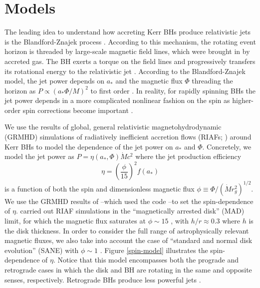 \documentclass[twocolumn, linenumbers]{aastex62} %
\begin{document}





\section{Models}    \label{models}

The leading idea to understand how accreting Kerr BHs produce relativistic jets is the Blandford-Znajek process \citep{Blandford1977, Blandford2019}. According to this mechanism, the rotating event horizon is threaded by large-scale magnetic field lines, which were brought in by accreted gas. %
The BH exerts a torque on the field lines and progressively transfers its rotational energy to the relativistic jet . According to the Blandford-Znajek model, the jet power depends on $a_*$ and the magnetic flux $\Phi$ threading the horizon as $P \propto ( a_* \Phi/M )^2$ to first order \citep{Blandford1977}. In reality, for rapidly spinning BHs the jet power depends in a more complicated nonlinear fashion on the spin as higher-order spin corrections become important . 

We use the results of global, general relativistic magnetohydrodynamic (GRMHD) simulations of radiatively inefficient accretion flows (RIAFs; \citealt{Yuan2014}) around Kerr BHs to model the dependence of the jet power on $a_*$ and $\Phi$. Concretely, we model the jet power as $P = \eta(a_*, \Phi) \dot{M} c^2$ where the jet production efficiency 
\begin{equation}
\eta = \left( \frac{\phi}{15} \right)^2 f(a_*)
\end{equation}
is a function of both the spin and dimensionless magnetic flux $\phi \equiv \Phi/(\dot{M} r_g^2)^{1/2}$. We use the GRMHD results of \cite{Sasha2012a}--which used the  code \citep{Gammie2003}--to set the spin-dependence of $\eta$. \cite{Sasha2012a} carried out RIAF simulations in the ``magnetically arrested disk'' (MAD) limit, for which the magnetic flux saturates at $\phi \sim 15$ \citep{Narayan2003, Sasha2011}, with $h/r \approx 0.3$ where $h$ is the disk thickness. In order to consider the full range of astrophysically relevant magnetic fluxes, we also take into account the case of  ``standard and normal disk evolution'' (SANE) with $\phi \sim 1$ . Figure  \ref{spin-model} illustrates the spin-dependence of $\eta$. Notice that this model encompasses both the prograde and retrograde cases in which the disk and BH are rotating in the same and opposite senses, respectively. Retrograde BHs produce less powerful jets \citep{Sasha2012}.
\end{document}
